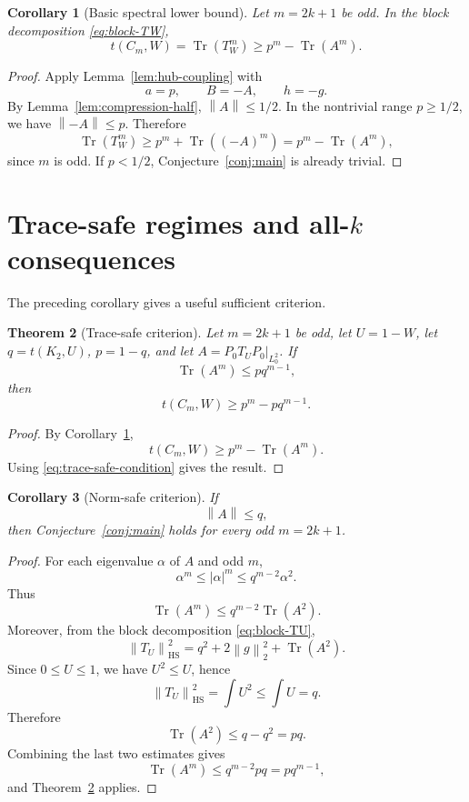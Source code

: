 \documentclass[11pt]{article}
\newtheorem{theorem}{Theorem}[section]
\newtheorem{corollary}[theorem]{Corollary}
\theoremstyle{definition}
\theoremstyle{remark}
\newcommand{\Tr}{\operatorname{Tr}}
\newcommand{\norm}[1]{\left\lVert #1\right\rVert}
\newcommand{\0}{\mathbf 0}
\begin{document}
\begin{corollary}[Basic spectral lower bound]\label{cor:basic-spectral-lower}
Let $m=2k+1$ be odd.  In the block decomposition \eqref{eq:block-TW},
\begin{equation}\label{eq:basic-spectral-lower}
        t(C_m,W)=\Tr(T_W^m)
        \ge
        p^m-\Tr(A^m).
\end{equation}
\end{corollary}

\begin{proof}
Apply Lemma~\ref{lem:hub-coupling} with
\[
        a=p,
        \qquad
        B=-A,
        \qquad
        h=-g.
\]
By Lemma~\ref{lem:compression-half}, $\norm A\le1/2$.  In the nontrivial range $p\ge1/2$, we have $\norm{-A}\le p$.  Therefore
\[
        \Tr(T_W^m)
        \ge p^m+\Tr((-A)^m)
        =p^m-\Tr(A^m),
\]
since $m$ is odd.  If $p<1/2$, Conjecture~\ref{conj:main} is already trivial.
\end{proof}

\section{Trace-safe regimes and all-$k$ consequences}

The preceding corollary gives a useful sufficient criterion.

\begin{theorem}[Trace-safe criterion]\label{thm:trace-safe}
Let $m=2k+1$ be odd, let $U=1-W$, let $q=t(K_2,U)$, $p=1-q$, and let $A=P_0T_UP_0|_{L^2_0}$.  If
\begin{equation}\label{eq:trace-safe-condition}
        \Tr(A^m)\le p q^{m-1},
\end{equation}
then
\[
        t(C_m,W)\ge p^m-pq^{m-1}.
\]
\end{theorem}

\begin{proof}
By Corollary~\ref{cor:basic-spectral-lower},
\[
        t(C_m,W)\ge p^m-\Tr(A^m).
\]
Using \eqref{eq:trace-safe-condition} gives the result.
\end{proof}

\begin{corollary}[Norm-safe criterion]\label{cor:norm-safe}
If
\[
        \norm A\le q,
\]
then Conjecture~\ref{conj:main} holds for every odd $m=2k+1$.
\end{corollary}

\begin{proof}
For each eigenvalue $\alpha$ of $A$ and odd $m$,
\[
        \alpha^m\le |\alpha|^m\le q^{m-2}\alpha^2.
\]
Thus
\[
        \Tr(A^m)\le q^{m-2}\Tr(A^2).
\]
Moreover, from the block decomposition \eqref{eq:block-TU},
\[
        \norm{T_U}_{\mathrm{HS}}^2
        =q^2+2\norm g_2^2+\Tr(A^2).
\]
Since $0\le U\le1$, we have $U^2\le U$, hence
\[
        \norm{T_U}_{\mathrm{HS}}^2=\int U^2\le \int U=q.
\]
Therefore
\[
        \Tr(A^2)\le q-q^2=pq.
\]
Combining the last two estimates gives
\[
        \Tr(A^m)\le q^{m-2}pq=pq^{m-1},
\]
and Theorem~\ref{thm:trace-safe} applies.
\end{proof}
\end{document}
